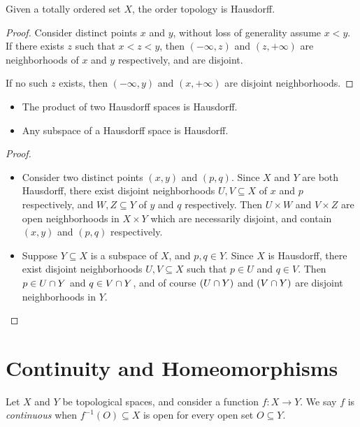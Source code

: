 \begin{lemma}
    Given a totally ordered set $X$, the order topology is Hausdorff.
\end{lemma}

\begin{proof}
    Consider distinct points $x$ and $y$, without loss of generality assume $x < y$. If there exists $z$ such that $x < z < y$, then $(-\infty, z)$ and $(z, +\infty)$ are neighborhoods of $x$ and $y$ respectively, and are disjoint.

    If no such $z$ exists, then $(-\infty, y)$ and $(x, +\infty)$ are disjoint neighborhoods.
\end{proof}

\begin{thm}\proofbreak
    \begin{itemize}
        \item The product of two Hausdorff spaces is Hausdorff.
        \item Any subspace of a Hausdorff space is Hausdorff.
    \end{itemize}
\end{thm}

\begin{proof}
    \proofbreak
    \begin{itemize}
        \item Consider two distinct points $(x, y)$ and $(p, q)$. Since $X$ and $Y$ are both Hausdorff, there exist disjoint neighborhoods $U, V \subseteq X$ of $x$ and $p$ respectively, and $W, Z \subseteq Y$ of $y$ and $q$ respectively. Then $U \times W$ and $V \times Z$ are open neighborhoods in $X \times Y$ which are necessarily disjoint, and contain $(x, y)$ and $(p, q)$ respectively.
        \item Suppose $Y \subseteq X$ is a subspace of $X$, and $p, q \in Y$. Since $X$ is Hausdorff, there exist disjoint neighborhoods $U, V \subseteq X$ such that $p \in U$ and $q \in V$. Then $p \in U \cap Y$ and $q \in V \cap Y$, and of course $(U \cap Y)$ and $(V \cap Y)$ are disjoint neighborhoods in $Y$.
    \end{itemize}
\end{proof}

\section{Continuity and Homeomorphisms}

\begin{defn}
    Let $X$ and $Y$ be topological spaces, and consider a function $f: X \to Y$. We say $f$ is \emph{continuous} when $f^{-1}(O) \subseteq X$ is open for every open set $O \subseteq Y$.
\end{defn}

